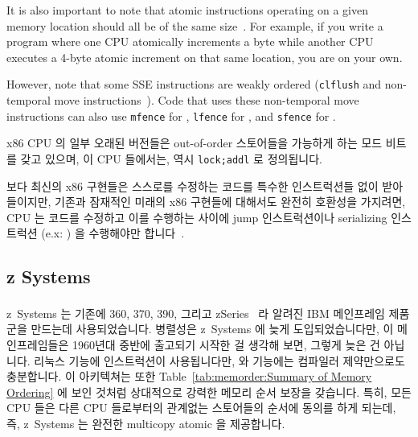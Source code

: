 It is also important to note that atomic instructions operating
on a given memory location should all be of the same
size~\cite[Section 8.1.2.2]{Intel64IA32v3A2011}.
For example, if you write a program where one CPU atomically increments
a byte while another CPU executes a 4-byte atomic increment on
that same location, you are on your own.

However, note that some SSE instructions are weakly ordered ({\tt clflush}
and non-temporal move instructions~\cite{IntelXeonV2b-96a}).
Code that uses these non-temporal move instructions
can also use {\tt mfence} for ,
{\tt lfence} for , and {\tt sfence} for .
\fi

x86 CPU 의 일부 오래된 버전들은 out-of-order 스토어들을 가능하게 하는 모드
비트를 갖고 있으며, 이 CPU 들에서는,  역시 {\tt lock;addl} 로
정의됩니다.

보다 최신의 x86 구현들은 스스로를 수정하는 코드를 특수한 인스트럭션들 없이
받아들이지만, 기존과 잠재적인 미래의 x86 구현들에 대해서도 완전히 호환성을
가지려면, CPU 는 코드를 수정하고 이를 수행하는 사이에 jump 인스트럭션이나
serializing 인스트럭션 (e.x: ) 을 수행해야만 합니다~\cite[Section
8.1.3]{Intel64IA32v3A2011}.

\subsection{z Systems}

z~Systems 는 기존에 360, 370, 390, 그리고 zSeries~\cite{IBMzSeries04a} 라
알려진 IBM\textsuperscript{\texttrademark} 메인프레임 제품군을 만드는데
사용되었습니다.
병렬성은 z~Systems 에 늦게 도입되었습니다만, 이 메인프레임들은 1960년대 중반에
출고되기 시작한 걸 생각해 보면, 그렇게 늦은 건 아닙니다.
리눅스  기능에  인스트럭션이 사용됩니다만,  와  기능에는 컴파일러 제약만으로도 충분합니다.
이 아키텍쳐는 또한
Table~\ref{tab:memorder:Summary of Memory Ordering}
에 보인 것처럼 상대적으로 강력한 메모리 순서 보장을 갖습니다.
특히, 모든 CPU 들은 다른 CPU 들로부터의 관계없는 스토어들의 순서에 동의를 하게 되는데, 즉, z~Systems 는 완전한 multicopy atomic 을 제공합니다.
\iffalse


